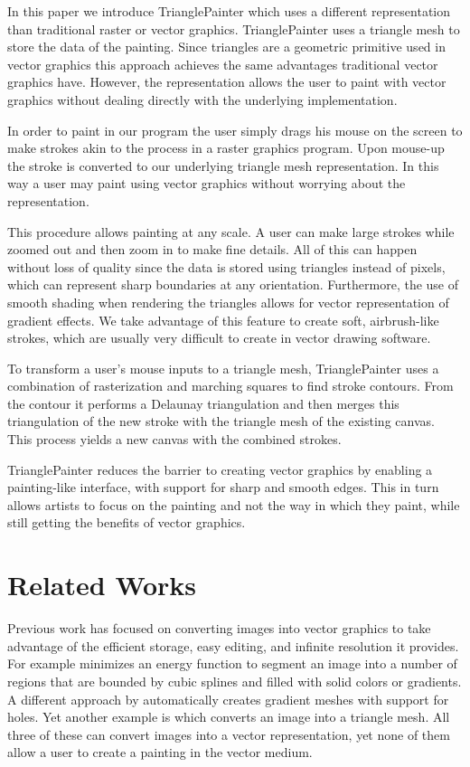 \documentclass[review]{acmsiggraph}
\begin{document}
In this paper we introduce TrianglePainter which  
uses a different representation than traditional raster or vector graphics.
TrianglePainter uses a triangle mesh to store the data of the painting.
Since triangles are a geometric primitive used in vector graphics this approach achieves the
same advantages traditional vector graphics have. However, the representation allows the
user to paint with vector graphics without dealing directly with the underlying implementation.

In order to paint in our program the user simply drags his mouse on the screen to make
strokes akin to the process in a raster graphics program. Upon mouse-up the stroke is
converted to our underlying triangle mesh representation. In this way a user may paint using
vector graphics without worrying about the representation.

This procedure allows painting at any scale. A user can make large strokes
while zoomed out and then zoom in to make fine details. All of this can happen without
loss of quality since the data is stored using triangles instead of pixels, which can represent sharp boundaries at any orientation.  Furthermore, the use of smooth shading when rendering the triangles allows for vector representation of gradient effects.  We take advantage of this feature to create soft, airbrush-like strokes, which are usually very difficult to create in vector drawing software.

To transform a user's mouse inputs to a triangle mesh,
TrianglePainter uses a combination of rasterization and marching squares to
find stroke contours. From the contour it performs a Delaunay triangulation
and then merges this triangulation
of the new stroke with the triangle mesh of the existing canvas. This process yields
a new canvas with the combined strokes.

TrianglePainter reduces the barrier to creating vector graphics by enabling a painting-like interface, with support for sharp and smooth edges. This in turn allows 
artists to focus on the painting and not the way in which they paint, while still 
getting the benefits of vector graphics.

\section{Related Works}

Previous work has focused on converting images into vector graphics to take advantage of the
efficient storage, easy editing, and infinite resolution it provides. For example \cite{lecot:ARD:2006}
minimizes an energy function to segment an image into a number of regions that are bounded
by cubic splines and filled with solid colors or gradients. A different approach by \cite{Lai:2009:ATG:1531326.1531391} 
automatically creates gradient meshes with support for holes. Yet another example is \cite{10.1109/TVCG.2012.76} 
which converts an image into a triangle mesh. All three of these can convert images into
a vector representation, yet none of them allow a user to create a painting in the vector medium.
\end{document}
